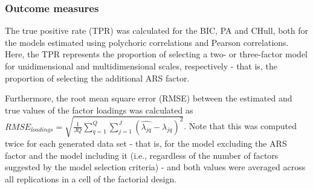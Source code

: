 \documentclass[a4paper,man,natbib]{apa6}
\begin{document}
\begin{linenumbers}
\subsubsection{Outcome measures} 
The true positive rate (TPR) was calculated for the BIC, PA and CHull, both for the models estimated using polychoric correlations and Pearson correlations. Here, the TPR represents the proportion of selecting a two- or three-factor model for unidimensional and multidimensional scales, respectively - that is, the proportion of selecting the additional ARS factor.



Furthermore, the root mean square error (RMSE) between the estimated and true values of the factor loadings was calculated as  $RMSE_{loadings} = \sqrt{\frac{1}{JQ} \sum_{q=1}^{Q} \sum_{j=1}^{J} (\hat{\lambda_{jq}} - \lambda_{jq})^2}$. Note that this was computed twice for each generated data set - that is, for the model excluding the ARS factor and the model including it (i.e., regardless of the number of factors suggested by the model selection criteria) - and both values were averaged across all replications in a cell of the factorial design. 


\end{linenumbers}
\end{document}

